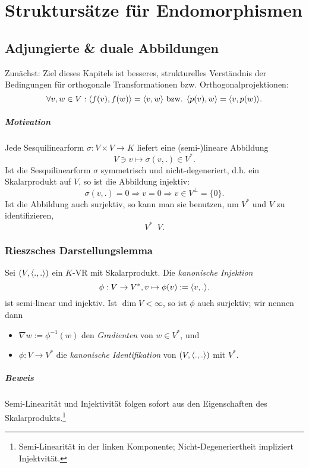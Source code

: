\chapter{Struktursätze für Endomorphismen}
\section{Adjungierte \& duale Abbildungen}
	Zunächst: Ziel dieses Kapitels ist besseres, strukturelles Verständnis der Bedingungen für orthogonale Transformationen bzw. Orthogonalprojektionen:
		\[ \forall v,w\in V: \langle f(v),f(w) \rangle = \langle v,w \rangle \text{ bzw. } \langle p(v),w \rangle = \langle v,p(w) \rangle. \]
\paragraph{Motivation}
	Jede Sesquilinearform $ \sigma: V\times V\to K $ liefert  eine (semi-)lineare Abbildung
		\[ V\ni v\mapsto \sigma(v,.)\in V^*. \]
	Ist die Sesquilinearform $ \sigma $ symmetrisch und nicht-degeneriert, d.h. ein Skalarprodukt auf $ V $, so ist die Abbildung injektiv:
		\[ \sigma(v,.) = 0 \Rightarrow v = 0 \Rightarrow v\in V^\perp = \{0\}. \]
	Ist die Abbildung auch surjektiv, so kann man sie benutzen, um $ V^* $ und $ V $ zu identifizieren,
		\[ V^* \mathop{\overline{\simeq}} V. \]
\subsection{Rieszsches Darstellungslemma}
\begin{Lemma}
	Sei $ (V,\langle .,. \rangle) $ ein $ K $-VR mit Skalarprodukt. Die \emph{kanonische Injektion}
		\[ \phi : V\to V^*, v\mapsto \phi(v):= \langle v,. \rangle. \]
	ist semi-linear und injektiv. Ist $ \dim V < \infty $, so ist $ \phi $ auch surjektiv; wir nennen dann
		\begin{itemize}
			\item $\nabla w := \phi^{-1}(w) $ den \emph{Gradienten} von $ w\in V^* $, und
			\item $ \phi: V\to V^* $ die \emph{kanonische Identifikation} von $ (V,\langle .,. \rangle) $ mit $ V^* $.
		\end{itemize}
\end{Lemma}
\paragraph{Beweis}
	Semi-Linearität und Injektivität folgen sofort aus den Eigenschaften des Skalarprodukts.\footnote{Semi-Linearität in der linken Komponente; Nicht-Degeneriertheit impliziert Injektvität.}
	

